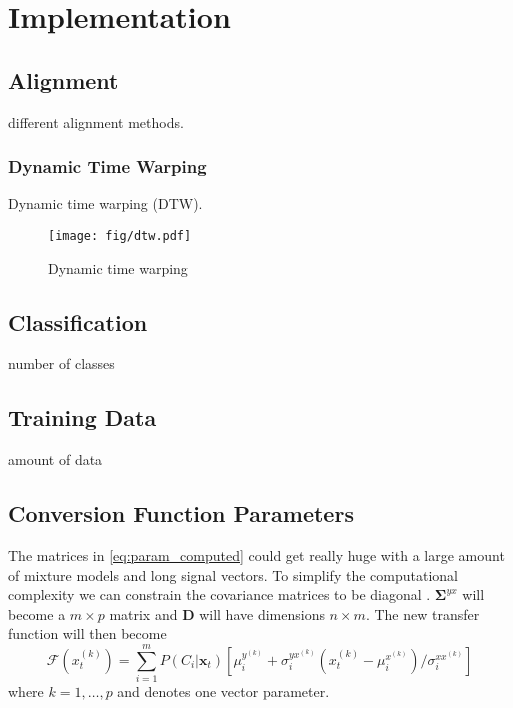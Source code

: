 \chapter{Implementation} %
\label{cha:implementation}
\section{Alignment} %
\label{sec:alignment}
different alignment methods.

\subsection{Dynamic Time Warping} %
\label{sub:dynamic_time_warping}
Dynamic time warping (DTW).
\begin{figure}[htbp]
	\begin{center}
		\texttt{[image: fig/dtw.pdf]}
		\caption{Dynamic time warping}
		\label{fig:dtw}
	\end{center}
\end{figure}



\section{Classification} %
\label{sec:classification}
number of classes

\section{Training Data} %
\label{sec:training_data}
amount of data

\section{Conversion Function Parameters} %
\label{sec:conversion_function_parameters}
The matrices in \eqref{eq:param_computed} could get really huge with a large amount of mixture models and long signal vectors. To simplify the computational complexity we can constrain the covariance matrices to be diagonal \cite{stylianou98}. $\mathbf{\Sigma}^{yx}$ will become a $m\times p$ matrix and $\mathbf{D}$ will have dimensions $n\times m$. The new transfer function will then become
\begin{equation}
	\mathcal{F}(x_t^{(k)}) = \sum_{i=1}^{m}P(C_i \vert \mathbf{x}_t)[\mu_i^{y^{(k)}}+\sigma_i^{yx^{(k)}}  (x_t^{(k)}-\mu_i^{x^{(k)}})/\sigma_i^{xx^{(k)}}]
\end{equation}
where $k=1,\dots,p$ and denotes one vector parameter.

